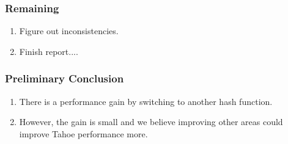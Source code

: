 \documentclass[screen]{beamer}
\begin{document}
\begin{frame}
    \frametitle{Remaining}
    \begin{enumerate}
        \item Figure out inconsistencies.
        \item Finish report....
    \end{enumerate}
\end{frame}

\begin{frame}
    \frametitle{Preliminary Conclusion}
    \begin{enumerate}
        \item There is a performance gain by switching to another hash
        function.
        \item However, the gain is small and we believe improving other areas
        could improve Tahoe performance more.
    \end{enumerate}
\end{frame}
\end{document}

